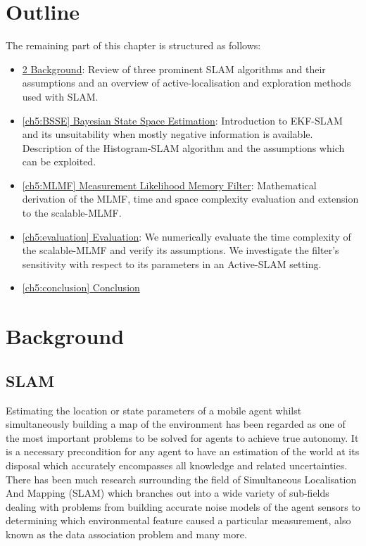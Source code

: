 \section{Outline}


The remaining part of this chapter is structured as follows:


\begin{itemize}
 \item \hyperref[ch5:background]{\ref{ch5:background} Background}: Review of three prominent SLAM algorithms
 and their assumptions and an overview of active-localisation and exploration methods used with SLAM.
 \item \hyperref[ch5:BSSE]{\ref{ch5:BSSE} Bayesian State Space Estimation}:  Introduction to EKF-SLAM and
 its unsuitability when mostly negative information is available. Description 
 of the Histogram-SLAM algorithm and the assumptions which can be exploited.
 \item \hyperref[ch5:MLMF]{\ref{ch5:MLMF} Measurement Likelihood Memory Filter}:
 Mathematical derivation of the MLMF, time and space complexity evaluation and extension to 
 the scalable-MLMF.
 \item \hyperref[ch5:evaluation]{\ref{ch5:evaluation} Evaluation}:
 We numerically evaluate the time complexity of the scalable-MLMF and verify its assumptions.
 We investigate the filter's sensitivity with respect to its parameters in an Active-SLAM setting.
 \item \hyperref[ch5:conclusion]{\ref{ch5:conclusion} Conclusion}
\end{itemize}

\section{Background}\label{ch5:background}

\subsection{SLAM}

Estimating the location or state parameters of a mobile agent whilst simultaneously building a map of the environment has been
regarded as one of the most important problems to be solved for agents to achieve true autonomy. It is a necessary precondition for 
any agent to have an estimation of the world at its disposal which accurately encompasses all knowledge and related uncertainties. 
There has been much research surrounding the field of Simultaneous Localisation And Mapping (SLAM) which branches out into a wide variety of sub-fields 
dealing with problems from building accurate noise models of the agent sensors \citep{Plagemann07gaussianbeam} to determining which environmental 
feature caused a particular measurement, also known as the data association problem \citep{DataAssociation2003} and many more. 

